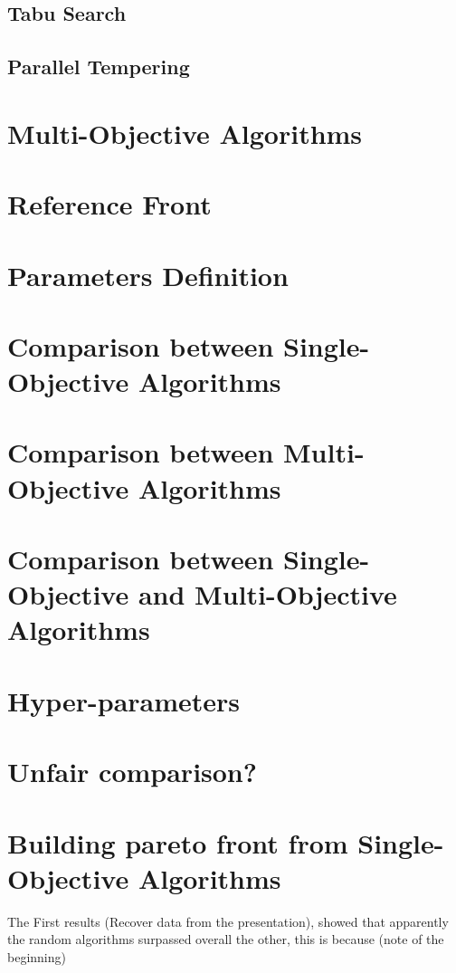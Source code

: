 \subsection{Tabu Search} 
\subsection{Parallel Tempering} 

\section{Multi-Objective Algorithms}

\section{Reference Front}

\section{Parameters Definition}

\section{Comparison between Single-Objective Algorithms}

\section{Comparison between Multi-Objective Algorithms}

\section{Comparison between Single-Objective and Multi-Objective Algorithms}

\section{Hyper-parameters}

\section{Unfair comparison?}

\section{Building pareto front from Single-Objective Algorithms}


The First results (Recover data from the presentation), showed that apparently the random algorithms surpassed overall the other, this is because (note of the beginning) 